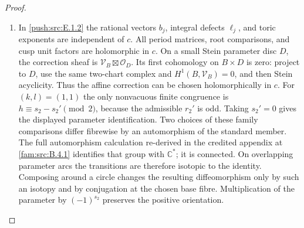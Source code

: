 \begin{proof}
\begin{enumerate}[label=\arabic*.,leftmargin=*]
\item In \ref{push:src:E.1.2} the rational vectors $b_j$, integral defects $\ell_j$,
and toric exponents are independent of $c$.  All period matrices,
root comparisons, and cusp unit factors are holomorphic in $c$.
On a small Stein parameter disc $D$, the correction sheaf is
$\mathcal V_B\boxtimes\mathcal O_D$.  Its first cohomology on
$B\times D$ is zero: project to $D$, use the same two-chart
complex and $H^1(B,\mathcal V_B)=0$, and then Stein acyclicity.
Thus the affine correction can be chosen holomorphically in $c$.
For $(k,l)=(1,1)$ the only nonvacuous finite congruence is
$h\equiv s_2-s_2'\pmod2$, because the admissible $r_2'$ is odd.
Taking $s_2'=0$ gives the displayed parameter identification.
Two choices of these family comparisons differ fibrewise by an
automorphism of the standard member.  The full automorphism
calculation re-derived in the credited appendix at \ref{fam:src:B.4.1} identifies that group with $\mathbb C^*$;
it is connected.  On overlapping parameter arcs the transitions
are therefore isotopic to the identity.  Composing around a circle
changes the resulting diffeomorphism only by such an isotopy and
by conjugation at the chosen base fibre.  Multiplication of the
parameter by $(-1)^{s_2}$ preserves the positive orientation.
\end{enumerate}
\end{proof}

